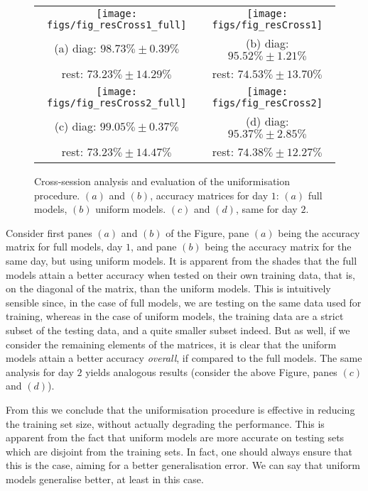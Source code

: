 \begin{figure} \centering
  \begin{tabular}{cc}
    \texttt{[image: figs/fig\_resCross1\_full]} &
    \texttt{[image: figs/fig\_resCross1]} \\
    (a) diag: $98.73\% \pm 0.39\%$  & (b) diag: $95.52\% \pm 1.21\%$ \\
        rest: $73.23\% \pm 14.29\%$ & rest: $74.53\% \pm 13.70\%$ \\
    \texttt{[image: figs/fig\_resCross2\_full]} &
    \texttt{[image: figs/fig\_resCross2]} \\
    (c) diag: $99.05\% \pm 0.37\%$ & (d) diag: $95.37\% \pm 2.85\%$ \\
        rest: $73.23\% \pm 14.47\%$ & rest: $74.38\% \pm 12.27\%$ \\
  \end{tabular}
  \caption{Cross-session analysis and evaluation of the uniformisation
    procedure. $(a)$ and $(b)$, accuracy matrices for day $1$: $(a)$
    full models, $(b)$ uniform models. $(c)$ and $(d)$, same for day $2$.}
  \label{fig:cross_initial}
\end{figure}

Consider first panes $(a)$ and $(b)$ of the Figure, pane $(a)$
being the accuracy matrix for full models, day $1$, and pane $(b)$
being the accuracy matrix for the same day, but using uniform
models. It is apparent from the shades that the full models attain
a better accuracy when tested on their own training data, that is,
on the diagonal of the matrix, than the uniform models.  This is
intuitively sensible since, in the case of full models, we are
testing on the same data used for training, whereas in the case of
uniform models, the training data are a strict subset of the
testing data, and a quite smaller subset indeed. But as well, if
we consider the remaining elements of the matrices, it is clear
that the uniform models attain a better accuracy \emph{overall},
if compared to the full models. The same analysis for day $2$
yields analogous results (consider the above Figure, panes $(c)$
and $(d)$).

From this we conclude that the uniformisation procedure is effective
in reducing the training set size, without actually degrading the
performance. This is apparent from the fact that uniform models are
more accurate on testing sets which are disjoint from the training
sets. In fact, one should always ensure that this is the case, aiming
for a better generalisation error. We can say that uniform models
generalise better, at least in this case.

